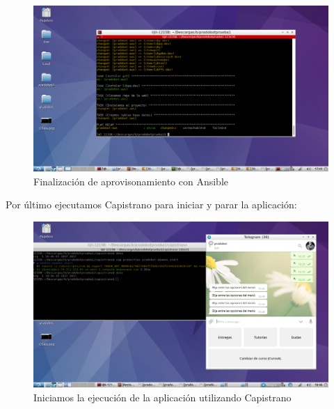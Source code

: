 \begin{figure}[H] %
\centering
\includegraphics[scale=0.3]{imagenes/random/2017-09-05-174148_1366x768_scrot.png}  %

\caption{Finalización de aprovisonamiento con Ansible}\label{figura94}

\end{figure}

Por último ejecutamos Capistrano para iniciar y parar la aplicación:

\begin{figure}[H] %
\centering
\includegraphics[scale=0.3]{imagenes/random/2017-09-05-184638_1366x768_scrot.png}  %

\caption{Iniciamos la ejecución de la aplicación utilizando Capistrano}\label{figura905}

\end{figure}


